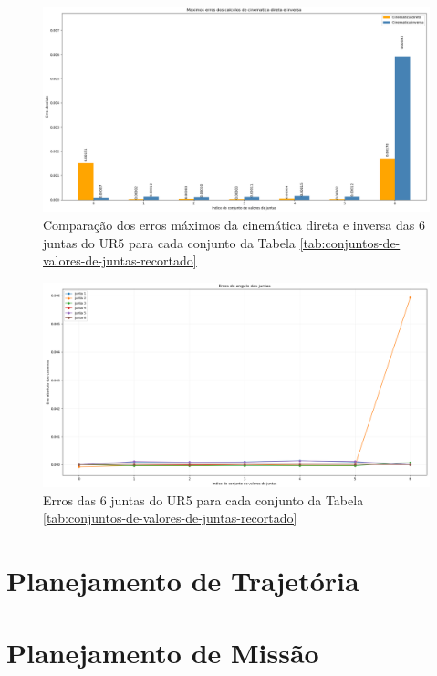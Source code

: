 \begin{figure}[htp]
	\centering
	\caption{Comparação dos erros máximos da cinemática direta e inversa
		das 6 juntas do UR5 para cada conjunto da Tabela \ref{tab:conjuntos-de-valores-de-juntas-recortado}}
	\label{fig:max-erros-set-2}
	\includegraphics[width=\textwidth]{images/maximos_erros_set_2.png}
\end{figure}

\begin{figure}[htp]
	\centering
	\caption{Erros das 6 juntas do UR5 para cada conjunto da Tabela \ref{tab:conjuntos-de-valores-de-juntas-recortado}}
	\label{fig:grafico-erro-juntas-set-2}
	\includegraphics[width=\textwidth]{images/erro_do_angulo_das_juntas_set_2.png}
\end{figure}

\section{Planejamento de Trajetória}

\section{Planejamento de Missão}




